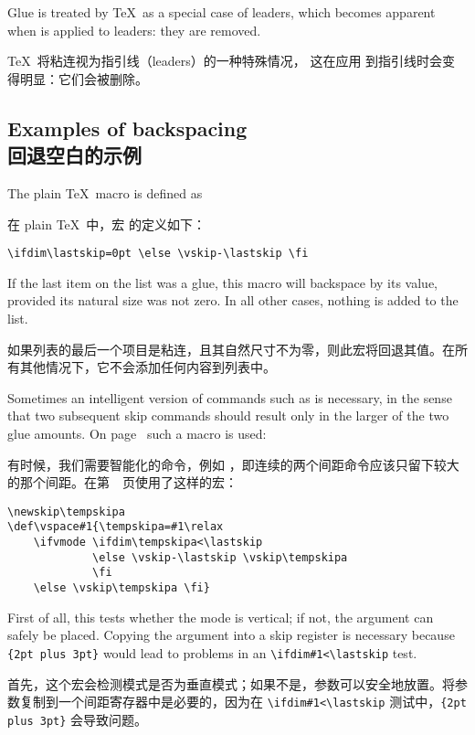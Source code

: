 Glue is treated by \TeX\ as a special case of leaders,
which becomes apparent when  is applied to
leaders: they are removed.

\TeX\ 将粘连视为指引线（leaders）的一种特殊情况，
这在应用  到指引线时会变得明显：它们会被删除。



\subsection{Examples of backspacing\\回退空白的示例}

The plain \TeX\ macro  is defined
as 

在 plain \TeX\ 中，宏  的定义如下：\begin{verbatim}
\ifdim\lastskip=0pt \else \vskip-\lastskip \fi
\end{verbatim}
If the last item on the list was a glue, this macro will
backspace by its value, provided its natural size was not zero.
In all other cases, nothing is added to the list.

如果列表的最后一个项目是粘连，且其自然尺寸不为零，则此宏将回退其值。在所有其他情况下，它不会添加任何内容到列表中。

Sometimes an intelligent version of commands such as 
is necessary, in the sense that two subsequent skip commands
should result only in the larger of the two glue amounts.
On page~\pageref{skip:scheme} such a macro is used:

有时候，我们需要智能化的命令，例如 ，即连续的两个间距命令应该只留下较大的那个间距。在第~\pageref{skip:scheme}~页使用了这样的宏：
\begin{verbatim}
\newskip\tempskipa
\def\vspace#1{\tempskipa=#1\relax
    \ifvmode \ifdim\tempskipa<\lastskip 
             \else \vskip-\lastskip \vskip\tempskipa
             \fi
    \else \vskip\tempskipa \fi}
\end{verbatim}
First of all, this tests whether the mode is vertical; 
if not, the argument can safely be placed.
Copying the argument into a skip register is necessary
because \verb>{2pt plus 3pt}> would lead to 
problems in an \verb>\ifdim#1<\lastskip> test.

首先，这个宏会检测模式是否为垂直模式；如果不是，参数可以安全地放置。将参数复制到一个间距寄存器中是必要的，因为在 \verb>\ifdim#1<\lastskip> 测试中，\verb>{2pt plus 3pt}> 会导致问题。


